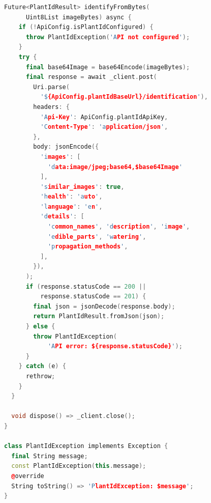 \begin{lstlisting}[language=C++]
  Future<PlantIdResult> identifyFromBytes(
      Uint8List imageBytes) async {
    if (!ApiConfig.isPlantIdConfigured) {
      throw PlantIdException('API not configured');
    }
    try {
      final base64Image = base64Encode(imageBytes);
      final response = await _client.post(
        Uri.parse(
          '${ApiConfig.plantIdBaseUrl}/identification'),
        headers: {
          'Api-Key': ApiConfig.plantIdApiKey,
          'Content-Type': 'application/json',
        },
        body: jsonEncode({
          'images': [
            'data:image/jpeg;base64,$base64Image'
          ],
          'similar_images': true,
          'health': 'auto',
          'language': 'en',
          'details': [
            'common_names', 'description', 'image',
            'edible_parts', 'watering',
            'propagation_methods',
          ],
        }),
      );
      if (response.statusCode == 200 ||
          response.statusCode == 201) {
        final json = jsonDecode(response.body);
        return PlantIdResult.fromJson(json);
      } else {
        throw PlantIdException(
            'API error: ${response.statusCode}');
      }
    } catch (e) {
      rethrow;
    }
  }

  void dispose() => _client.close();
}

class PlantIdException implements Exception {
  final String message;
  const PlantIdException(this.message);
  @override
  String toString() => 'PlantIdException: $message';
}
\end{lstlisting}

\vspace{1cm}


